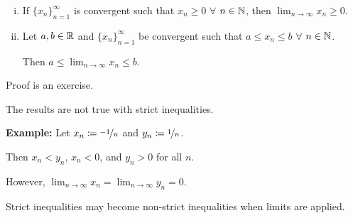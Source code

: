 \documentclass[10pt,aspectratio=149]{beamer}
\begin{document}
\begin{frame}

\begin{corollary}
\begin{enumerate}[(i)]
\item If $\{ x_n \}_{n=1}^\infty$ is convergent
such that $x_n \geq 0$ $\forall$ $n \in {\mathbb{N}}$,
then
\quad
$\displaystyle
\lim_{n\to\infty} x_n \geq 0$.
\item\pause
Let $a,b \in {\mathbb{R}}$ and
$\{ x_n \}_{n=1}^\infty$ be convergent such that
$a \leq x_n \leq b$
$\forall$ $n \in {\mathbb{N}}$.

Then
$\displaystyle a \leq \lim_{n\to\infty} x_n \leq b$.
\end{enumerate}
\end{corollary}

\pause

Proof is an exercise.

\pause
\medskip

The results are not true with strict inequalities.

\pause
\medskip 

\textbf{Example:}
Let $x_n \coloneqq \nicefrac{-1}{n}$ and $y_n \coloneqq \nicefrac{1}{n}$.

\pause
Then $x_n < y_n$, $x_n < 0$, and $y_n > 0$ for all $n$.

\pause
However, $\displaystyle \lim_{n\to\infty} x_n = \lim_{n\to\infty} y_n = 0$.

\pause
\medskip

Strict inequalities may become non-strict
inequalities when limits are applied.
\end{frame}
\end{document}
